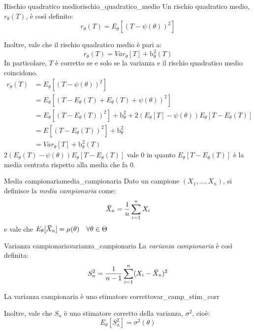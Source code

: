 \documentclass[12pt]{report}
\newcounter{theorem}
\newcounter{definition}
\newcommand{\nmu}{}
\newcommand{\wbar}[1]{%
	\accentset{\mbox{\rule{0.55em}{0.5pt}}}{#1}%
}
\begin{document}
	\begin{definition}{\nmu Rischio quadratico medio}{rischio_quadratico_medio}
		Un rischio quadratico medio, $r_{\theta}(T)$, è così definito:
		\[
		r_{\theta}(T) = E_\theta[(T - \psi(\theta))^2]
		\]
	\end{definition}
	Inoltre, vale che il rischio quadratico medio è pari a:
	\[
	r_{\theta}(T) = Var_\theta[T] + \text{b}_\theta^2(T)
	\]
	In particolare, $T$ è corretto se e solo se la varianza e il rischio quadratico medio coincidono.
	\begin{align*}
		r_\theta(T) &= E_\theta[(T - \psi(\theta))^2] \\
		&= E_\theta[(T - E_\theta(T) + E_\theta(T) + \psi(\theta))^2] \\
		&= E_\theta[(T - E_\theta(T))^2] + \text{b}_\theta^2 + 2(E_\theta[T] - \psi(\theta))E_\theta[T - E_\theta(T)] \\
		&= E[(T - E_\theta(T))^2] + \text{b}_\theta^2 \\
		&= Var_\theta[T] + \text{b}_\theta^2(T)
	\end{align*}
	$2(E_\theta(T) - \psi(\theta))E_\theta[T - E_\theta(T)]$ vale 0 in quanto $E_\theta[T - E_\theta(T)]$ è la media centrata rispetto alla media che fa 0. \\
	\begin{definition}{\nmu Media campionaria}{media_campionaria}
		Dato un campione $(X_1, \dots, X_n)$, si definisce la \textit{media campionaria} come:
		\[
		\wbar{X}_n = \dfrac{1}{n}\sum_{i=1}^{n}X_i
		\]
		e vale che $E_\theta[\wbar{X}_n] = \mu(\theta) \quad \forall\theta \in \Theta$
	\end{definition}
	\begin{definition}{\nmu Varianza campionaria}{varianza_campionaria}
		La \textit{varianza campionaria} è così definita:
		\[
		S_n^2= \dfrac{1}{n-1}\sum_{i=1}^{n}(X_i - \wbar{X}_n)^2
		\]
	\end{definition}
	\begin{theorem}{\nmu La varianza campionaria è uno stimatore corretto}{var_camp_stim_corr}

		Inoltre, vale che $S_n$ è uno stimatore corretto della varianza, $\sigma^2$, cioè:
		\[
		E_\theta[S_n^2] = \sigma^2(\theta)
		\]
	\end{theorem}
\end{document}
